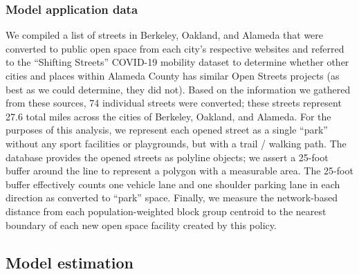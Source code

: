 \documentclass[3p, authoryear, review]{elsarticle} %
\begin{document}
\hypertarget{model-application-data}{%
\subsubsection{Model application data}\label{model-application-data}}

We compiled a list of streets in Berkeley, Oakland, and Alameda that were converted to public open space from each city's respective websites \citep{city_of_alameda_slow_2020, city_of_oakland_oakland_2020, city_of_berkeley_berkeley_2020} and referred to the ``Shifting Streets'' COVID-19 mobility dataset \citep{slowstreets} to determine whether other cities and places within Alameda County has similar Open Streets projects (as best as we could determine, they did not). Based on the information we gathered from these sources, 74 individual streets were converted; these streets represent 27.6 total miles across the cities of Berkeley, Oakland, and Alameda. For the purposes of this analysis, we represent each opened street as a single ``park'' without any sport facilities or playgrounds, but with a trail / walking path. The database provides the opened streets as polyline objects; we assert a 25-foot buffer around the line to represent a polygon with a measurable area. The 25-foot buffer effectively counts one vehicle lane and one shoulder parking lane in each direction as converted to ``park'' space. Finally, we measure the network-based distance from each population-weighted block group centroid to the nearest boundary of each new open space facility created by this policy.

\hypertarget{model-estimation}{%
\subsection{Model estimation}\label{model-estimation}}
\end{document}
